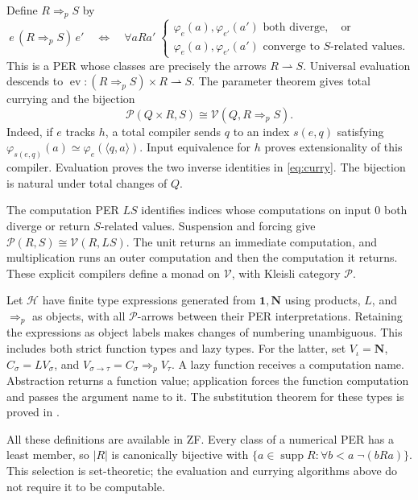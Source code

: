 \documentclass[11pt]{article}
\theoremstyle{definition}
\newcommand{\Pcat}{\mathcal P}
\newcommand{\Vcat}{\mathcal V}
\newcommand{\Hcat}{\mathcal H}
\newcommand{\pArr}{\mathbin{\Rightarrow_{\!p}}}
\newcommand{\supp}{\operatorname{supp}}
\newcommand{\ev}{\operatorname{ev}}
\begin{document}
Define $R\pArr S$ by
\[
 e\,(R\pArr S)\,e'
 \quad\Longleftrightarrow\quad
 \forall aRa'\;
 \begin{cases}
 \varphi_e(a),\varphi_{e'}(a')\text{ both diverge},\quad\text{or}\\
 \varphi_e(a),\varphi_{e'}(a')\text{ converge to $S$-related values}.
 \end{cases}
\]
This is a PER whose classes are precisely the arrows
$R\rightharpoonup S$. Universal evaluation descends to
$\ev:(R\pArr S)\times R\rightharpoonup S$. The parameter
theorem gives total currying and the bijection
\begin{equation}\label{eq:curry}
 \Pcat(Q\times R,S)\cong\Vcat(Q,R\pArr S).
\end{equation}
Indeed, if $e$ tracks $h$, a total compiler sends $q$ to an index
$s(e,q)$ satisfying
$\varphi_{s(e,q)}(a)\simeq\varphi_e(\langle q,a\rangle)$.
Input equivalence for $h$ proves extensionality of this compiler.
Evaluation proves the two inverse identities in \eqref{eq:curry}.
The bijection is natural under total changes of $Q$.

The computation PER $LS$ identifies indices whose computations on
input $0$ both diverge or return $S$-related values. Suspension and
forcing give $\Pcat(R,S)\cong\Vcat(R,LS)$. The unit returns an
immediate computation, and multiplication runs an outer computation
and then the computation it returns. These explicit compilers define
a monad on $\Vcat$, with Kleisli category $\Pcat$.

Let $\Hcat$ have finite type expressions generated from
$\mathbf1,\mathbf N$ using products, $L$, and $\pArr$ as objects,
with all $\Pcat$-arrows between their PER interpretations.
Retaining the expressions as object labels makes changes of numbering
unambiguous. This includes both strict function
types and lazy types. For the latter, set $V_\iota=\mathbf N$,
$C_\sigma=LV_\sigma$, and
$V_{\sigma\to\tau}=C_\sigma\pArr V_\tau$.
A lazy function receives a computation name. Abstraction returns a
function value; application forces the function computation and passes
the argument name to it. The substitution theorem for these types is
proved in \cite[Section 6]{Application}.

All these definitions are available in ZF. Every class of a numerical
PER has a least member, so $|R|$ is canonically bijective with
$\{a\in\supp R:\forall b<a\;\neg(bRa)\}$. This selection is
set-theoretic; the evaluation and currying algorithms above do not
require it to be computable.
\end{document}

